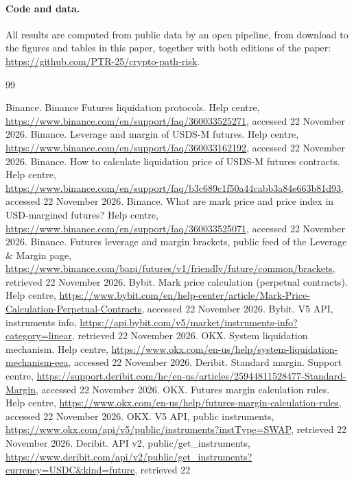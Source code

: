\paragraph{Code and data.} All results are computed from public data by an open pipeline, from
download to the figures and tables in this paper, together with both editions of the paper:
\url{https://github.com/PTR-25/crypto-path-risk}.

\begin{thebibliography}{99}\small\raggedright
{} Binance. Binance Futures liquidation protocols. Help centre,
\url{https://www.binance.com/en/support/faq/360033525271}, accessed 22 November 2026.
 Binance. Leverage and margin of USDS-M
futures. Help centre, \url{https://www.binance.com/en/support/faq/360033162192}, accessed 22 November
2026.
 Binance. How to calculate liquidation price of USDS-M
futures contracts. Help centre,
\url{https://www.binance.com/en/support/faq/b3c689c1f50a44cabb3a84e663b81d93}, accessed 22 November
2026.
 Binance. What are mark price and price index in USD-margined futures? Help
centre, \url{https://www.binance.com/en/support/faq/360033525071}, accessed 22 November 2026.
 Binance. Futures leverage and margin brackets, public feed of the Leverage
\& Margin page, \url{https://www.binance.com/bapi/futures/v1/friendly/future/common/brackets},
retrieved 22 November 2026.
 Bybit. Mark price calculation (perpetual contracts). Help centre,
\url{https://www.bybit.com/en/help-center/article/Mark-Price-Calculation-Perpetual-Contracts},
accessed 22 November 2026.
 Bybit. V5 API, instruments info,
\url{https://api.bybit.com/v5/market/instruments-info?category=linear}, retrieved 22 November 2026.
 OKX. System liquidation mechanism. Help centre,
\url{https://www.okx.com/en-us/help/system-liquidation-mechanism-eea}, accessed 22 November 2026.
 Deribit. Standard margin. Support centre,
\url{https://support.deribit.com/hc/en-us/articles/25944811528477-Standard-Margin}, accessed 22
November 2026.
 OKX. Futures margin calculation rules. Help centre,
\url{https://www.okx.com/en-us/help/futures-margin-calculation-rules}, accessed 22 November 2026.
 OKX. V5 API, public instruments,
\url{https://www.okx.com/api/v5/public/instruments?instType=SWAP}, retrieved 22 November 2026.
 Deribit. API v2, public/get\_instruments,
\url{https://www.deribit.com/api/v2/public/get_instruments?currency=USDC&kind=future}, retrieved 22

\end{thebibliography}
